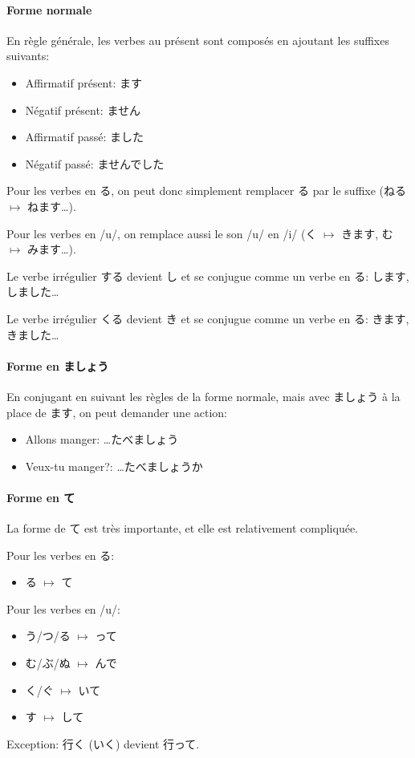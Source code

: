 \documentclass[a4paper,10pt,french,openany]{memoir}
\begin{document}
\paragraph{Forme normale}
En règle générale, les verbes au présent sont composés en ajoutant les suffixes suivants:
\begin{itemize}
 \item Affirmatif présent: ます
 \item Négatif présent: ません
 \item Affirmatif passé: ました
 \item Négatif passé: ませんでした
\end{itemize}

Pour les verbes en る, on peut donc simplement remplacer る par le suffixe (ねる $\mapsto$ ねます\dots).

Pour les verbes en /u/, on remplace aussi le son /u/ en /i/ (く $\mapsto$ きます, む $\mapsto$ みます\dots).

Le verbe irrégulier する devient し et se conjugue comme un verbe en る: します, しました\dots

Le verbe irrégulier くる devient き et se conjugue comme un verbe en る: きます, きました\dots

\paragraph{Forme en ましょう}
En conjugant en suivant les règles de la forme normale, mais avec ましょう à la place de ます, on peut demander une action:
\begin{itemize}
 \item Allons manger: \dots たべましょう
 \item Veux-tu manger?: \dots たべましょうか
\end{itemize}

\paragraph{Forme en て}
La forme de て est très importante, et elle est relativement compliquée.

Pour les verbes en る:
\begin{itemize}
 \item る $\mapsto$ て
\end{itemize}

Pour les verbes en /u/:
\begin{itemize}
 \item う/つ/る $\mapsto$ って
 \item む/ぶ/ぬ $\mapsto$ んで
 \item く/ぐ $\mapsto$ いて
 \item す $\mapsto$ して
\end{itemize}
Exception: 行く (いく) devient 行って.
\end{document}
